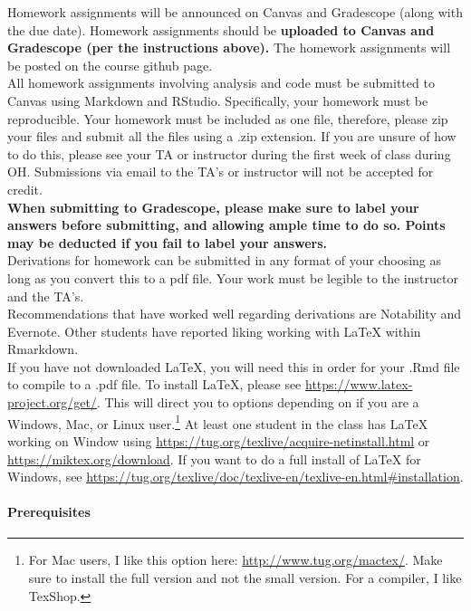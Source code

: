 \documentclass[11pt]{article}
\begin{document}
Homework assignments will be announced on Canvas and Gradescope (along with the due date). Homework assignments should be \textbf{uploaded to Canvas and Gradescope (per the instructions above).} The homework assignments will be posted on the course github page. \\

All homework assignments involving analysis and code must be submitted to Canvas using Markdown and RStudio. Specifically, your homework must be reproducible. Your homework must be included as one file, therefore, please zip your files and submit all the files using a .zip extension. If you are unsure of how to do this, please see your TA or instructor during the first week of class during OH. Submissions via email to the TA's or instructor will not be accepted for credit. \\

\textbf{When submitting to Gradescope, please make sure to label your answers before submitting, and allowing ample time to do so. Points may be deducted if you fail to label your answers.}\\

Derivations for homework can be submitted in any format of your choosing as long as you convert this to a pdf file. Your work must be legible to the instructor and the TA's. \\

Recommendations that have worked well regarding derivations are Notability and Evernote. Other students have reported liking working with LaTeX within Rmarkdown. \\

If you have not downloaded LaTeX, you will need this in order for your .Rmd file to compile to a .pdf file. To install LaTeX, please see \url{https://www.latex-project.org/get/}. This will direct you to options depending on if you are a Windows, Mac, or Linux user.\footnote{For Mac users, I like this option here: \url{http://www.tug.org/mactex/}. Make sure to install the full version and not the small version. For a compiler, I like TexShop.}  At least one student in the class has LaTeX working on Window using \url{https://tug.org/texlive/acquire-netinstall.html} or \url{https://miktex.org/download}. If you want to do a full install of LaTeX for Windows, see \url{https://tug.org/texlive/doc/texlive-en/texlive-en.html#installation}.


\paragraph{Prerequisites}
\end{document}
